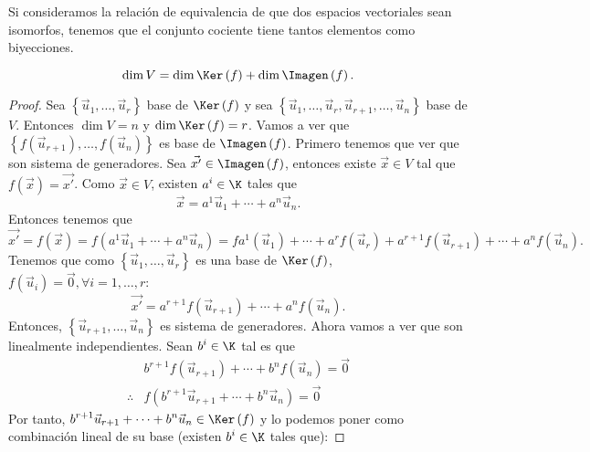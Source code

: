 \begin{observation}
\normalfont Si consideramos la relación de equivalencia de que dos espacios vectoriales sean isomorfos, tenemos que el conjunto cociente tiene tantos elementos como biyecciones.
\end{observation}

\begin{ftheorem}[]
\normalfont 
\[\dim V = \dim \Ker\left(f\right) + \dim \Imagen\left(f\right) .\]
\end{ftheorem}
\begin{proof}
	Sea $\displaystyle \left\{ \vec{u}_{1}, \ldots, \vec{u}_{r}\right\}  $ base de $\displaystyle \Ker\left(f\right) $ y sea $\displaystyle \left\{ \vec{u}_{1}, \ldots, \vec{u}_{r}, \vec{u}_{r+1}, \ldots, \vec{u}_{n}\right\}  $ base de $\displaystyle V $. Entonces $\displaystyle \dim V = n $ y $\displaystyle \dim \Ker\left(f\right) = r $. Vamos a ver que $\displaystyle \left\{ f\left(\vec{u}_{r+1}\right), \ldots, f\left(\vec{u}_{n}\right)\right\}  $ es base de $\displaystyle \Imagen\left(f\right) $. Primero tenemos que ver que son sistema de generadores. Sea $\displaystyle \vec{x'} \in \Imagen\left(f\right) $, entonces existe $\displaystyle \vec{x} \in V $ tal que $\displaystyle f\left(\vec{x}\right) = \vec{x'} $. Como $\displaystyle \vec{x}\in V $, existen $\displaystyle a^{i}\in\K $ tales que
	\[ \vec{x} = a^{1}\vec{u}_{1} + \cdots + a^{n}\vec{u}_{n}.\]
Entonces tenemos que
\[\vec{x'} = f\left(\vec{x}\right) = f\left(a^{1}\vec{u}_{1} + \cdots + a^{n}\vec{u}_{n}\right) = fa^{1}\left(\vec{u}_{1}\right) + \cdots + a^{r}f\left(\vec{u}_{r}\right) + a^{r+1}f(\vec{u}_{r+1}) + \cdots + a^{n} f\left(\vec{u}_{n}\right) .\]
Tenemos que como $\displaystyle \left\{ \vec{u}_{1}, \ldots, \vec{u}_{r}\right\}  $ es una base de $\displaystyle \Ker\left(f\right) $, $\displaystyle f\left(\vec{u}_{i}\right) = \vec{0}, \forall i = 1, \ldots, r $:
\[\vec{x'} = a^{r+1}f\left(\vec{u}_{r+1}\right) + \cdots + a^{n}f\left(\vec{u}_{n}\right) .\]
Entonces, $\displaystyle \left\{ \vec{u}_{r+1}, \ldots, \vec{u}_{n}\right\}  $ es sistema de generadores. Ahora vamos a ver que son linealmente independientes. Sean $\displaystyle b^{i} \in \K $ tal es que 
\[
\begin{split}
  & b^{r+1}f\left(\vec{u}_{r+1}\right) + \cdots + b^{n}f\left(\vec{u}_{n}\right) = \vec{0} \\
 \therefore & f\left(b^{r+1}\vec{u}_{r+1} + \cdots + b^{n}\vec{u}_{n}\right) = \vec{0}
\end{split}
\]
Por tanto, $\displaystyle b^{r+1}\vec{u}_{r+1} + \cdots + b^{n}\vec{u}_{n} \in \Ker\left(f\right) $ y lo podemos poner como combinación lineal de su base (existen $\displaystyle b^{i}\in\K $ tales que):

\end{proof}
